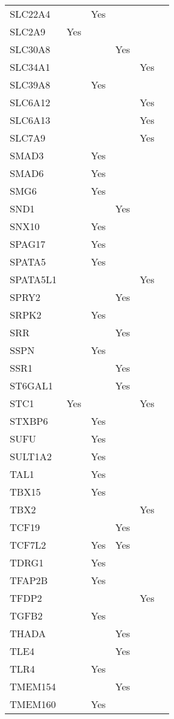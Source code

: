\documentclass[]{report}
\begin{document}
\begin{appendices}
\begin{longtable}[t]{llllll}
SLC22A4 &  & Yes &  &  & \\
SLC2A9 & Yes &  &  &  & \\
SLC30A8 &  &  & Yes &  & \\
SLC34A1 &  &  &  & Yes & \\
SLC39A8 &  & Yes &  &  & \\
SLC6A12 &  &  &  & Yes & \\
SLC6A13 &  &  &  & Yes & \\
SLC7A9 &  &  &  & Yes & \\
SMAD3 &  & Yes &  &  & \\
SMAD6 &  & Yes &  &  & \\
SMG6 &  & Yes &  &  & \\
SND1 &  &  & Yes &  & \\
SNX10 &  & Yes &  &  & \\
SPAG17 &  & Yes &  &  & \\
SPATA5 &  & Yes &  &  & \\
SPATA5L1 &  &  &  & Yes & \\
SPRY2 &  &  & Yes &  & \\
SRPK2 &  & Yes &  &  & \\
SRR &  &  & Yes &  & \\
SSPN &  & Yes &  &  & \\
SSR1 &  &  & Yes &  & \\
ST6GAL1 &  &  & Yes &  & \\
STC1 & Yes &  &  & Yes & \\
STXBP6 &  & Yes &  &  & \\
SUFU &  & Yes &  &  & \\
SULT1A2 &  & Yes &  &  & \\
TAL1 &  & Yes &  &  & \\
TBX15 &  & Yes &  &  & \\
TBX2 &  &  &  & Yes & \\
TCF19 &  &  & Yes &  & \\
TCF7L2 &  & Yes & Yes &  & \\
TDRG1 &  & Yes &  &  & \\
TFAP2B &  & Yes &  &  & \\
TFDP2 &  &  &  & Yes & \\
TGFB2 &  & Yes &  &  & \\
THADA &  &  & Yes &  & \\
TLE4 &  &  & Yes &  & \\
TLR4 &  & Yes &  &  & \\
TMEM154 &  &  & Yes &  & \\
TMEM160 &  & Yes &  &  & \\

\end{longtable}
\end{appendices}
\end{document}
